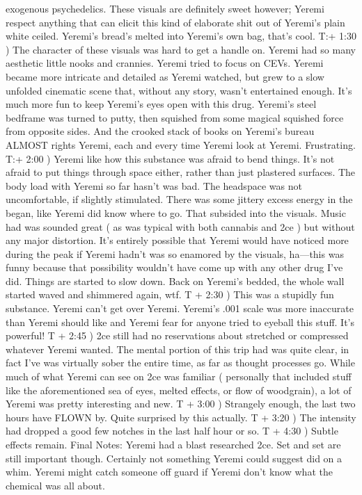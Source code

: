 \documentclass[12pt]{book}
\begin{document}
exogenous psychedelics. These visuals are definitely sweet however; Yeremi respect anything that can elicit this kind of elaborate shit out of Yeremi's plain white ceiled. Yeremi's bread's melted into Yeremi's own bag, that's cool. T:+ 1:30 ) The character of these visuals was hard to get a handle on. Yeremi had so many aesthetic little nooks and crannies. Yeremi tried to focus on CEVs. Yeremi became more intricate and detailed as Yeremi watched, but grew to a slow unfolded cinematic scene that, without any story, wasn't entertained enough. It's much more fun to keep Yeremi's eyes open with this drug. Yeremi's steel bedframe was turned to putty, then squished from some magical squished force from opposite sides. And the crooked stack of books on Yeremi's bureau ALMOST rights Yeremi, each and every time Yeremi look at Yeremi. Frustrating. T:+ 2:00 ) Yeremi like how this substance was afraid to bend things. It's not afraid to put things through space either, rather than just plastered surfaces. The body load with Yeremi so far hasn't was bad. The headspace was not uncomfortable, if slightly stimulated. There was some jittery excess energy in the began, like Yeremi did know where to go. That subsided into the visuals. Music had was sounded great ( as was typical with both cannabis and 2ce ) but without any major distortion. It's entirely possible that Yeremi would have noticed more during the peak if Yeremi hadn't was so enamored by the visuals, ha---this was funny because that possibility wouldn't have come up with any other drug I've did. Things are started to slow down. Back on Yeremi's bedded, the whole wall started waved and shimmered again, wtf. T + 2:30 ) This was a stupidly fun substance. Yeremi can't get over Yeremi. Yeremi's .001 scale was more inaccurate than Yeremi should like and Yeremi fear for anyone tried to eyeball this stuff. It's powerful! T + 2:45 ) 2ce still had no reservations about stretched or compressed whatever Yeremi wanted. The mental portion of this trip had was quite clear, in fact I've was virtually sober the entire time, as far as thought processes go. While much of what Yeremi can see on 2ce was familiar ( personally that included stuff like the aforementioned sea of eyes, melted effects, or flow of woodgrain), a lot of Yeremi was pretty interesting and new. T + 3:00 ) Strangely enough, the last two hours have FLOWN by. Quite surprised by this actually. T + 3:20 ) The intensity had dropped a good few notches in the last half hour or so. T + 4:30 ) Subtle effects remain. Final Notes: Yeremi had a blast researched 2ce. Set and set are still important though. Certainly not something Yeremi could suggest did on a whim. Yeremi might catch someone off guard if Yeremi don't know what the chemical was all about.
\end{document}
